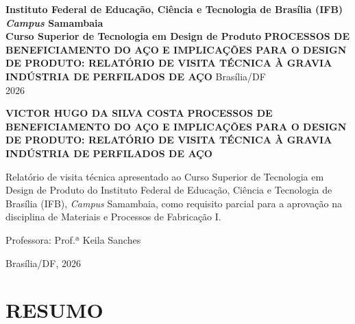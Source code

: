 \documentclass[12pt,a4paper,oneside,brazil,chapter=TITLE]{article}
\date{}
\newcommand{\secbreak}{\clearpage}
\let\oldsection\section
\renewcommand{\section}{\secbreak\oldsection}
\begin{document}
\begin{titlepage}
  \thispagestyle{empty}
  \begin{center}
    {\normalsize\bfseries
      Instituto Federal de Educação, Ciência e Tecnologia de Brasília (IFB)\\[0.3em]
      \textit{Campus} Samambaia\\[0.3em]
      Curso Superior de Tecnologia em Design de Produto
    }
    \vfill
    {\large\bfseries PROCESSOS DE BENEFICIAMENTO DO AÇO E IMPLICAÇÕES PARA O DESIGN DE PRODUTO: RELATÓRIO DE VISITA TÉCNICA À GRAVIA INDÚSTRIA DE PERFILADOS DE AÇO}
    \vfill
    {\normalsize Brasília/DF\\2026}
  \end{center}
\end{titlepage}
\setcounter{page}{2}

\begin{titlepage}
  \thispagestyle{empty}
  \begin{center}
    {\normalsize\bfseries VICTOR HUGO DA SILVA COSTA}
    \vfill
    {\large\bfseries PROCESSOS DE BENEFICIAMENTO DO AÇO E IMPLICAÇÕES PARA O DESIGN DE PRODUTO: RELATÓRIO DE VISITA TÉCNICA À GRAVIA INDÚSTRIA DE PERFILADOS DE AÇO}
    \vfill
    \begin{flushright}
      \begin{minipage}{0.5\textwidth}
        \normalsize
        Relatório de visita técnica apresentado ao Curso Superior de Tecnologia em Design de Produto do Instituto Federal de Educação, Ciência e Tecnologia de Brasília (IFB), \textit{Campus} Samambaia, como requisito parcial para a aprovação na disciplina de Materiais e Processos de Fabricação I.
        \vspace{1em}

        Professora: Prof.ª Keila Sanches
      \end{minipage}
    \end{flushright}
    \vfill
    {\normalsize Brasília/DF, 2026}
  \end{center}
\end{titlepage}

\section*{RESUMO}
\thispagestyle{plain}
\end{document}
